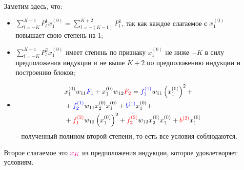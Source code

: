 \documentclass{report}
\begin{document}
\par Заметим здесь, что:
\begin{itemize}
    \item $\sum_{l=-K}^{K+1}P_{l}^1x_1^{(0)} = \sum_{l=-(K-1)}^{K+2}P_{l}^1$, 
    так как каждое слагаемое с $x_1^{(0)}$ повышает свою степень на 1;
    \item $\sum_{l=-K}^{K+1}P_{l}^2x_1^{(0)}$ имеет степень по признаку $x_1^{(0)}$ 
    не ниже $-K$ в силу предположения индукции и не выше $K+2$ по предположению индукции и построению блоков;
    \item 
    \begin{align*}
        &x_1^{(0)}w_{11}\color{blue}F_1\color{black} + x_1^{(0)}w_{12}\color{red}F_2\color{black} = \color{blue}f_1^{(1)}\color{black}w_{11}\left(x_1^{(0)}\right)^2 + \\
        &+\color{blue}f_2^{(1)}\color{black}w_{11}x_2^{(0)}x_1^{(0)} + \color{blue}b^{(1)}\color{black}x_1^{(0)} + \\
        &+\color{red}f_1^{(2)}\color{black}w_{12}\left(x_1^{(0)}\right)^2 + \color{red}f_2^{(2)}\color{black}w_{12}x_2^{(0)}x_1^{(0)} + \color{red}b^{(2)}\color{black}x_1^{(0)}
    \end{align*} -- полученный полином второй степени, то есть все условия соблюдаются.
\end{itemize}

\par Второе слагаемое это $\color{magenta}x_K\color{black}$ из предположения индукции, которое удовлетворяет условиям.
\end{document}
